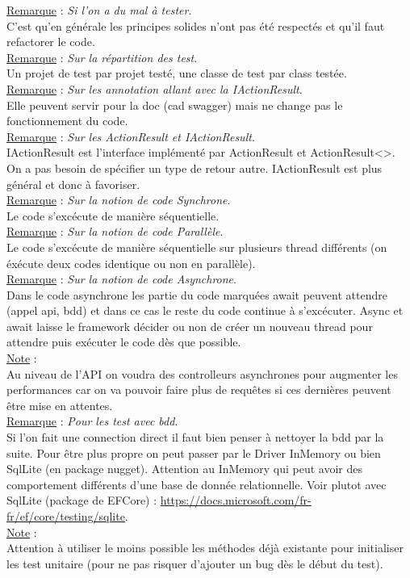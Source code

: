 \documentclass[a4paper,12pt,twoside]{article}
\newcommand{\incode}[1]{{\footnotesize\ttfamily #1}} %
\newcommand{\rem}[2]{\noindent\underline{Remarque} : \textit{#1}.\\ \indent #2}
\newcommand{\note}[1]{\noindent\underline{Note} : \\ \indent #1}
\begin{document}
\rem{Si l'on a du mal à tester}{C'est qu'en générale les principes solides n'ont pas été respectés et qu'il faut refactorer le code.}\\

\rem{Sur la répartition des test}{Un projet de test par projet testé, une classe de test par class testée.}\\

\rem{Sur les annotation allant avec la IActionResult}{Elle peuvent servir pour la doc (cad swagger) mais ne change pas le fonctionnement du code.}\\

\rem{Sur les ActionResult et IActionResult}{IActionResult est l'interface implémenté par ActionResult et ActionResult<>. On a pas besoin de spécifier un type de retour autre. IActionResult est plus général et donc à favoriser.}\\

\rem{Sur la notion de code Synchrone}{Le code s'excécute de manière séquentielle.}\\

\rem{Sur la notion de code Parallèle}{Le code s'excécute de manière séquentielle sur plusieurs thread différents (on éxécute deux codes identique ou non en parallèle).}\\

\rem{Sur la notion de code Asynchrone}{Dans le code asynchrone les partie du code marquées \incode{await} peuvent attendre (appel api, bdd) et dans ce cas le reste du code continue à s'excécuter. Async et await laisse le framework décider ou non de créer un nouveau thread pour attendre puis exécuter le code dès que possible.}\\

\note{Au niveau de l'API on voudra des controlleurs asynchrones pour augmenter les performances car on va pouvoir faire plus de requêtes si ces dernières peuvent être mise en attentes.}\\

\rem{Pour les test avec bdd}{Si l'on fait une connection direct il faut bien penser à nettoyer la bdd par la suite. Pour être plus propre on peut passer par le Driver InMemory ou bien SqlLite (en package nugget). Attention au InMemory qui peut avoir des comportement différents d'une base de donnée relationnelle. Voir plutot avec SqlLite (package de EFCore) : \url{https://docs.microsoft.com/fr-fr/ef/core/testing/sqlite}.}\\

\note{Attention à utiliser le moins possible les méthodes déjà existante pour initialiser les test unitaire (pour ne pas risquer d'ajouter un bug dès le début du test).}\\
\end{document}
